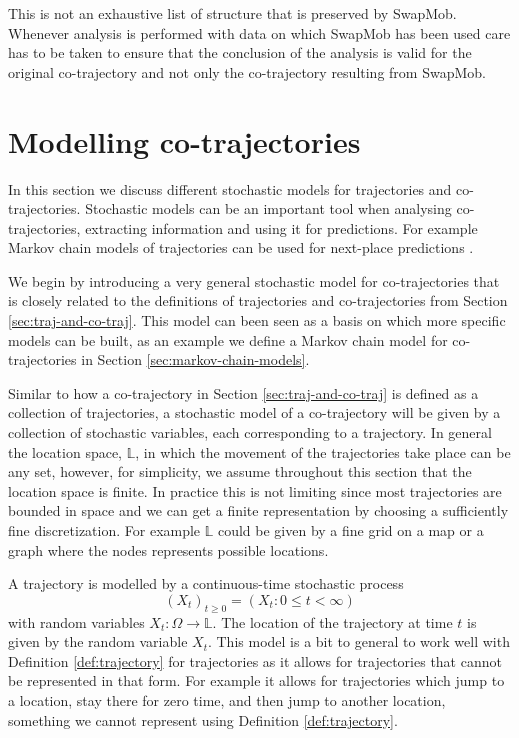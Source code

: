 \documentclass[12pt]{article}
\newcommand{\locset}{\mathbb{L}}
\theoremstyle{definition}
\begin{document}
This is not an exhaustive list of structure that is preserved by
SwapMob. Whenever analysis is performed with data on which SwapMob has
been used care has to be taken to ensure that the conclusion of the
analysis is valid for the original co-trajectory and not only the
co-trajectory resulting from SwapMob.

\section{Modelling co-trajectories}
\label{sec:modell-co-traj}
In this section we discuss different stochastic models for
trajectories and co-trajectories. Stochastic models can be an
important tool when analysing co-trajectories, extracting information
and using it for predictions. For example Markov chain models of
trajectories can be used for next-place predictions
\cite{gambs_show_2010, gambs_next_2012, yan_semitri:_2011}.

We begin by introducing a very general stochastic model for
co-trajectories that is closely related to the definitions of
trajectories and co-trajectories from Section
\ref{sec:traj-and-co-traj}. This model can been seen as a basis on
which more specific models can be built, as an example we define a
Markov chain model for co-trajectories in Section
\ref{sec:markov-chain-models}.

Similar to how a co-trajectory in Section \ref{sec:traj-and-co-traj}
is defined as a collection of trajectories, a stochastic model of a
co-trajectory will be given by a collection of stochastic variables,
each corresponding to a trajectory. In general the location space,
\(\locset\), in which the movement of the trajectories take place can
be any set, however, for simplicity, we assume throughout this section
that the location space is finite. In practice this is not limiting
since most trajectories are bounded in space and we can get a finite
representation by choosing a sufficiently fine discretization. For
example \(\locset\) could be given by a fine grid on a map or a graph
where the nodes represents possible locations.

A trajectory is modelled by a continuous-time stochastic process
\begin{equation*}
  (X_{t})_{t \geq 0} = (X_{t}: 0 \leq t < \infty)
\end{equation*}
with random variables \(X_{t}: \Omega \to \locset\). The location of
the trajectory at time \(t\) is given by the random variable
\(X_{t}\). This model is a bit to general to work well with Definition
\ref{def:trajectory} for trajectories as it allows for trajectories
that cannot be represented in that form. For example it allows for
trajectories which jump to a location, stay there for zero time, and
then jump to another location, something we cannot represent using
Definition \ref{def:trajectory}.
\end{document}
